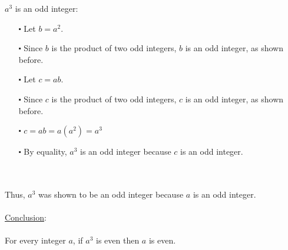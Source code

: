 \documentclass[12pt]{article}
\begin{document}
$a^3$ is an odd integer:
\begin{itemize}
  \item [$\centerdot$] Let $b = a^2$.
  \item [$\centerdot$] Since $b$ is the product of two odd integers, $b$ is an odd integer, as shown before.
  \item [$\centerdot$] Let $c = ab$.
  \item [$\centerdot$] Since $c$ is the product of two odd integers, $c$ is an odd integer, as shown before.
  \item [$\centerdot$] $c = ab = a(a^2) = a^3$
  \item [$\centerdot$] By equality, $a^3$ is an odd integer because $c$ is an odd integer.
\end{itemize}
\newblock
\\ \\
Thus, $a^3$ was shown to be an odd integer because $a$ is an odd integer.
\\ \\
\underline{Conclusion}:
\\ \\
For every integer $a$, if $a^3$ is even then $a$ is even.
\\ \\
\end{document}
